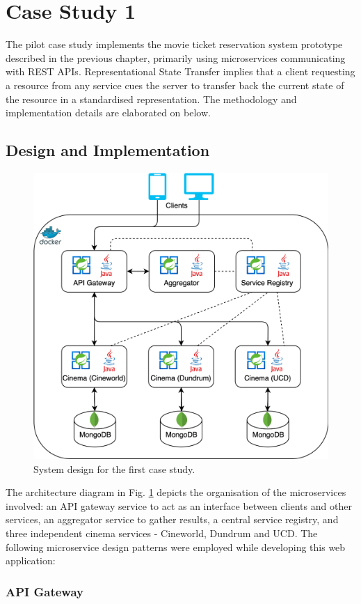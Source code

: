 \section{Case Study 1}

The pilot case study implements the movie ticket reservation system prototype described in the previous chapter, primarily using microservices communicating with REST APIs. Representational State Transfer implies that a client requesting a resource from any service cues the server to transfer back the current state of the resource in a standardised representation. The methodology and implementation details are elaborated on below.

\subsection{Design and Implementation}

\begin{figure}[H]
  \centering
  \includegraphics[width=0.6\linewidth]{./assets/diagrams/cs01-arch.png}
  \caption{System design for the first case study.}
  \label{fig:cs01-arch}
\end{figure}

The architecture diagram in Fig. \ref{fig:cs01-arch} depicts the organisation of the microservices involved: an API gateway service to act as an interface between clients and other services, an aggregator service to gather results, a central service registry, and three independent cinema services - Cineworld, Dundrum and UCD. The following microservice design patterns were employed while developing this web application:

\subsubsection{API Gateway}

